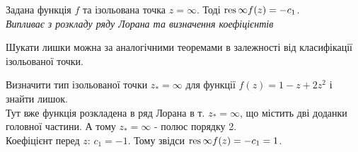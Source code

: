 \documentclass{math_library}
\begin{document}
\begin{theorem}
Задана функція $f$ та ізольована точка $z = \infty$. Тоді $\operatorname*{res}{\infty}{f(z)} = -c_1$.\\
\textit{Випливає з розкладу ряду Лорана та визначення коефіцієнтів}
\end{theorem}

Шукати лишки можна за аналогічними теоремами в залежності від класифікації ізольованої точки.

\begin{example}
Визначити тип ізольованої точки $z_* = \infty$ для функції $f(z) = 1 - z + 2z^2$ і знайти лишок.\\
Тут вже функція розкладена в ряд Лорана в т. $z_* = \infty$, що містить дві доданки головної частини. А тому $z_* = \infty$ - полюс порядку 2.\\
Коефіцієнт перед $z$: $c_1 = -1$. Тому звідси $\operatorname*{res}{\infty}{f(z)} = -c_1 = 1$.
\end{example}
\end{document}
